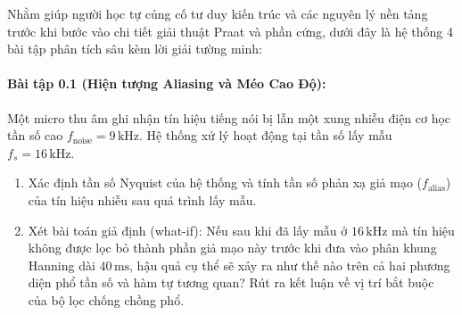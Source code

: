 Nhằm giúp người học tự củng cố tư duy kiến trúc và các nguyên lý nền tảng trước khi bước vào chi tiết giải thuật Praat và phần cứng, dưới đây là hệ thống 4 bài tập phân tích sâu kèm lời giải tường minh:

\paragraph{Bài tập 0.1 (Hiện tượng Aliasing và Méo Cao Độ):} Một micro thu âm ghi nhận tín hiệu tiếng nói bị lẫn một xung nhiễu điện cơ học tần số cao $f_{\mathrm{noise}} = 9\,\text{kHz}$. Hệ thống xử lý hoạt động tại tần số lấy mẫu $f_s = 16\,\text{kHz}$.
\begin{enumerate}[label=\alph*)]
    \item Xác định tần số Nyquist của hệ thống và tính tần số phản xạ giả mạo ($f_{\mathrm{alias}}$) của tín hiệu nhiễu sau quá trình lấy mẫu.
    \item Xét bài toán giả định (what-if): Nếu sau khi đã lấy mẫu ở $16\,\text{kHz}$ mà tín hiệu không được lọc bỏ thành phần giả mạo này trước khi đưa vào phân khung Hanning dài $40\,\text{ms}$, hậu quả cụ thể sẽ xảy ra như thế nào trên cả hai phương diện phổ tần số và hàm tự tương quan? Rút ra kết luận về vị trí bắt buộc của bộ lọc chống chồng phổ.
\end{enumerate}

